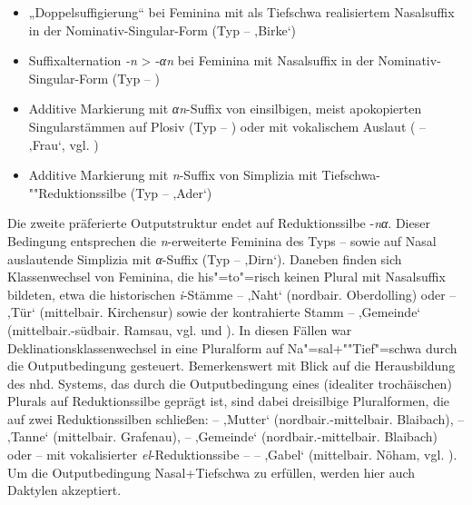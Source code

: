 \begin{itemize}\sloppy
\item „Doppelsuffigierung“ bei Feminina mit als Tiefschwa realisiertem Nasalsuffix in der Nominativ-Singular-Form (Typ  --  ‚Birke‘)
\item Suffixalternation \textit{{}-n} > -\textit{αn} bei Feminina mit Nasalsuffix in der Nominativ-Singular-Form (Typ  -- )
\item Additive Markierung mit \textit{αn}{}-Suffix von einsilbigen, meist apokopierten Singularstämmen auf Plosiv (Typ  -- ) oder mit vokalischem Auslaut ( --  ‚Frau‘, vgl. \citealt[153]{Rowley1997})
\item Additive Markierung mit \textit{n}{}-Suffix von Simplizia mit Tief\-schwa-""Re\-duk\-tions\-sil\-be (Typ  --  ‚Ader‘)
\end{itemize}

Die zweite präferierte Outputstruktur endet auf Reduktionssilbe {-\textit{nα}}. Dieser Bedingung entsprechen die \textit{n}{}-erweiterte Feminina des Typs  --  sowie auf Nasal auslautende Simplizia mit \textit{α}{}-Suffix (Typ  --  ‚Dirn‘). Daneben finden sich Klassenwechsel von Feminina, die his"=to"=risch keinen Plural mit Nasalsuffix bildeten, etwa die historischen \textit{i}{}-Stämme  --  ‚Naht‘ (nordbair. Oberdolling) oder  --  ‚Tür‘ (mittelbair. Kirchensur) sowie der kontrahierte Stamm  --  ‚Gemeinde‘ (mittelbair.-südbair. Ramsau, vgl. 	 und \citealt[160]{Rowley1997}). In diesen Fällen war Deklinationsklassenwechsel in eine Pluralform auf Na"=sal+""Tief"=schwa durch die Outputbedingung gesteuert. Bemerkenswert mit Blick auf die Herausbildung des nhd. Systems, das durch die Outputbedingung eines (idealiter trochäischen) Plurals auf Reduktionssilbe geprägt ist, sind dabei dreisilbige Pluralformen, die auf zwei Reduktionssilben schließen:  --  ‚Mutter‘ (nordbair.-mittelbair. Blaibach),   --  ‚Tanne‘ (mittelbair. Grafenau),  --  ‚Gemeinde‘ (nordbair.-mittelbair. Blaibach) oder -- mit vokalisierter \textit{el}{}-Reduktionssibe --  --  ‚Gabel‘ (mittelbair. Nöham, vgl. \citealt[128]{SNiB7}). Um die Outputbedingung Nasal+Tiefschwa zu erfüllen, werden hier auch Daktylen akzeptiert.


